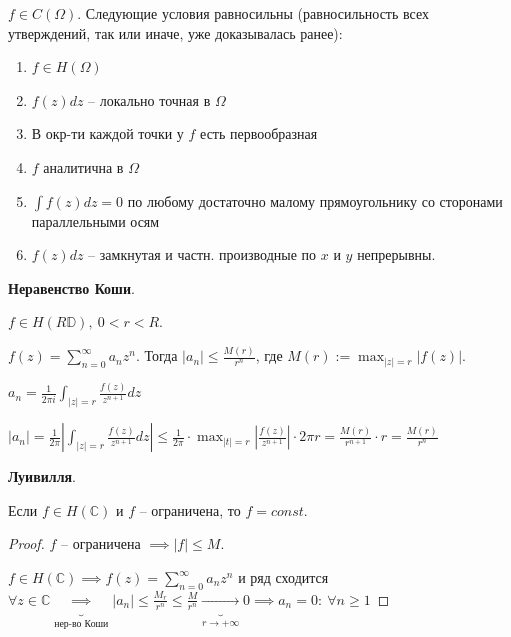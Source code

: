 \begin{theorem}
    $f \in C(\Omega)$. Следующие условия равносильны (равносильность всех утверждений, так или иначе, уже доказывалась ранее):

    \begin{enumerate}
        \item {
            $f \in H(\Omega)$
        }
        \item {
            $f(z) dz$ -- локально точная в $\Omega$
        }
        \item {
            В окр-ти каждой точки у $f$ есть первообразная
        }
        \item {
            $f$ аналитична в $\Omega$
        }
        \item {
            $\int{f(z) dz} = 0$ по любому достаточно малому прямоугольнику со сторонами параллельными осям
        }
        \item {
            $f(z) dz$ -- замкнутая и частн. производные по $x$ и $y$ непрерывны.
        }
    \end{enumerate}
\end{theorem}

\begin{theorem}
    \textbf{Неравенство Коши}.

    $f \in H(R \mathbb{D}), \ 0 < r < R$.

    $f(z) = \sum_{n=0}^{\infty} {a_n z^n}$. Тогда $|a_n| \leq \frac{M(r)}{r^n}$, где $M(r) := \max_{|z| = r} |f(z)|$.
\end{theorem}
\begin{theorem}
    $a_n = \frac{1}{2 \pi i} \int_{|z| = r} { \frac{f(z)}{z^{n + 1}} dz }$

    $|a_n| = \frac{1}{2 \pi} \left| \int_{|z| = r} { \frac{f(z)}{z^{n+1}} dz } \right| \leq \frac{1}{2 \pi} \cdot \max_{|t| = r} \left|\frac{f(z)}{z^{n+1}}\right| \cdot 2 \pi r = \frac{M(r)}{r^{n + 1}} \cdot r = \frac{M(r)}{r^n}$
\end{theorem}

\begin{theorem}
    \textbf{Луивилля}.

    Если $f \in H(\mathbb{C})$ и $f$ -- ограничена, то $f = const$.
\end{theorem}
\begin{proof}
    $f$ -- ограничена $\implies |f| \leq M$.
    
    $f \in H(\mathbb{C}) \implies f(z) = \sum_{n=0}^{\infty} { a_n z^{n} }$ и ряд сходится $\forall z \in \mathbb{C} \underbrace{\implies}_{\text{нер-во Коши}} |a_n| \leq \frac{M_r}{r^n} \leq \frac{M}{r^n} \underbrace{\rightarrow}_{r \rightarrow +\infty} 0 \implies a_n = 0: \ \forall n \geq 1$
\end{proof}

